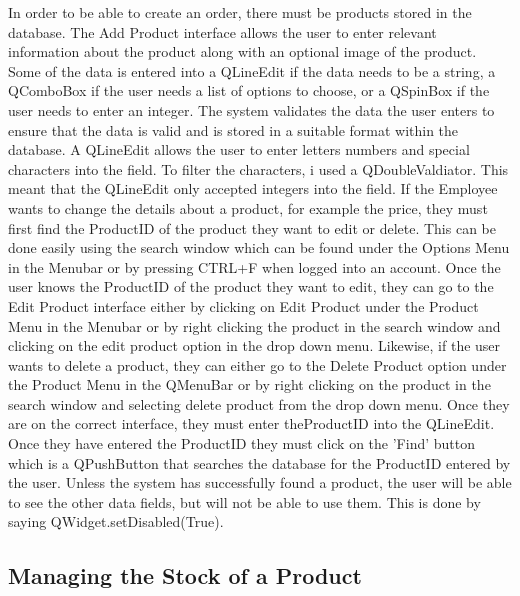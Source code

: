 In order to be able to create an order, there must be products stored in the database. The Add Product interface allows the user to enter relevant information about the product along with an optional image of the product. Some of the data is entered into a QLineEdit if the data needs to be a string, a QComboBox if the user needs a list of options to choose, or a QSpinBox if the user needs to enter an integer. The system validates the data the user enters to ensure that the data is valid and is stored in a suitable format within the database. A QLineEdit allows the user to enter letters numbers and special characters into the field. To filter the characters, i used a QDoubleValdiator. This meant that the QLineEdit only accepted integers into the field. If the Employee wants to change the details about a product, for example the price, they must first find the ProductID of the product they want to edit or delete. This can be done easily using the search window which can be found under the Options Menu in the Menubar or by pressing CTRL+F when logged into an account. Once the user knows the ProductID of the product they want to edit, they can go to the Edit Product interface either by clicking on Edit Product under the Product Menu in the Menubar or by right clicking the product in the search window and clicking on the edit product option in the drop down menu. Likewise, if the user wants to delete a product, they can either go to the Delete Product option under the Product Menu in the QMenuBar or by right clicking on the product in the search window and selecting delete product from the drop down menu. Once they are on the correct interface, they must enter theProductID into the QLineEdit. Once they have entered the ProductID they must click on the 'Find' button which is a QPushButton that searches the database for the ProductID entered by the user. Unless the system has successfully found a product, the user will be able to see the other data fields, but will not be able to use them. This is done by saying QWidget.setDisabled(True).

\subsection{Managing the Stock of a Product}

